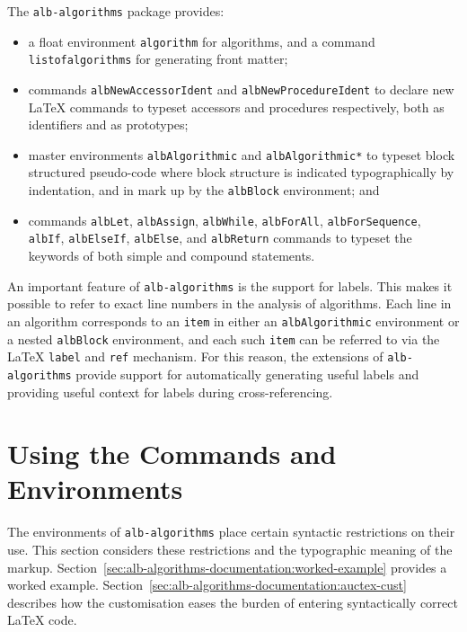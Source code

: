 \documentclass[11pt,a4paper,oneside,titlepage]{alb-corp}
\begin{document}
The \texttt{alb-algorithms} package provides:
\begin{itemize}
\item a float environment \texttt{algorithm} for algorithms, and a
  command \texttt{listofalgorithms} for generating front matter;
\item commands \texttt{albNewAccessorIdent} and
  \texttt{albNewProcedureIdent} to declare new \LaTeX{} commands to
  typeset accessors and procedures respectively, both as identifiers and
  as prototypes;
\item master environments \texttt{albAlgorithmic} and
  \texttt{albAlgorithmic*} to typeset block structured pseudo-code where
  block structure is indicated typographically by indentation, and in
  mark up by the \texttt{albBlock} environment; and
\item commands \texttt{albLet}, \texttt{albAssign}, \texttt{albWhile},
  \texttt{albForAll}, \texttt{albForSequence}, \texttt{albIf},
  \texttt{albElseIf}, \texttt{albElse}, and \texttt{albReturn} commands
  to typeset the keywords of both simple and compound statements.
\end{itemize}

An important feature of \texttt{alb-algorithms} is the support for
labels.  This makes it possible to refer to exact line numbers in the
analysis of algorithms.  Each line in an algorithm corresponds to an
\texttt{item} in either an \texttt{albAlgorithmic} environment or a
nested \texttt{albBlock} environment, and each such \texttt{item} can be
referred to via the \LaTeX{} \texttt{label} and \texttt{ref} mechanism.
For this reason, the \AUCTeX{} extensions of \texttt{alb-algorithms}
provide support for automatically generating useful labels and providing
useful context for labels during cross-referencing.




\section{Using the Commands and Environments}
\label{sec:alb-algorithms-documentation:using-comm-envir}

The environments of \texttt{alb-algorithms} place certain syntactic
restrictions on their use.  This section considers these restrictions
and the typographic meaning of the markup.
Section~\ref{sec:alb-algorithms-documentation:worked-example} provides a
worked example.
Section~\ref{sec:alb-algorithms-documentation:auctex-cust} describes how
the \AUCTeX{} customisation eases the burden of entering syntactically
correct \LaTeX{} code.
\end{document}
